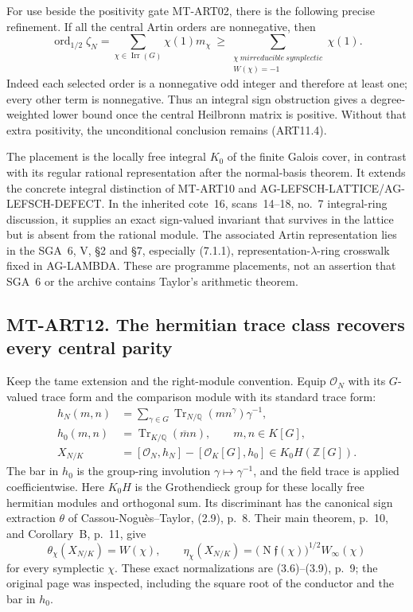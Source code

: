 For use beside the positivity gate MT-ART02, there is the
following precise refinement. If all the central Artin
orders are nonnegative, then
\[
 \operatorname{ord}_{1/2}\zeta_N
   =\sum_{\chi\in\operatorname{Irr}(G)}\chi(1)m_\chi
   \ \ge\!
   \sum_{\substack{\chi\ {
m irreducible\ symplectic}\\W(\chi)=-1}}
                         \chi(1).                       \tag{ART11.5}
\]
Indeed each selected order is a nonnegative odd integer
and therefore at least one; every other term is
nonnegative. Thus an integral sign obstruction gives a
degree-weighted lower bound once the central Heilbronn
matrix is positive. Without that extra positivity, the
unconditional conclusion remains (ART11.4).

The placement is the locally free integral $K_0$ of the
finite Galois cover, in contrast with its regular rational
representation after the normal-basis theorem. It extends
the concrete integral distinction of MT-ART10 and
AG-LEFSCH-LATTICE/AG-LEFSCH-DEFECT. In the inherited
cote~16, scans~14--18, no.~7 integral-ring discussion,
it supplies an exact sign-valued invariant that survives
in the lattice but is absent from the rational module.
The associated Artin representation lies in the
SGA~6, V, \S2 and \S7, especially (7.1.1),
representation-$\lambda$-ring crosswalk fixed in AG-LAMBDA.
These are programme placements, not an assertion that
SGA~6 or the archive contains Taylor's arithmetic theorem.

\subsection*{MT-ART12. The hermitian trace class recovers every central parity}
Keep the tame extension and the right-module convention.
Equip $\mathcal O_N$ with its $G$-valued trace form
and the comparison module with its standard trace form:
\[
 \begin{split}
 h_N(m,n)&=\sum_{\gamma\in G}
                \operatorname{Tr}_{N/\mathbb Q}(m n^\gamma)
                                \gamma^{-1},\\
 h_0(m,n)&=\operatorname{Tr}_{K/\mathbb Q}(\overline m n),
       \qquad m,n\in K[G],\\
 X_{N/K}&=[\mathcal O_N,h_N]-[\mathcal O_K[G],h_0]
                   \in K_0H(\mathbb Z[G]).
 \end{split}                                             \tag{ART12.1}
\]
The bar in $h_0$ is the group-ring involution
$\gamma\mapsto\gamma^{-1}$, and the field trace is
applied coefficientwise. Here $K_0H$ is the Grothendieck
group for these locally free hermitian modules and
orthogonal sum. Its discriminant has the canonical
sign extraction $\theta$ of Cassou-Nogu\`es--Taylor,
(2.9), p.~8. Their main theorem, p.~10, and
Corollary~B, p.~11, give
\[
 \theta_\chi(X_{N/K})=W(\chi),\qquad
 \eta_\chi(X_{N/K})=
       \bigl(\operatorname{N}\mathfrak f(\chi)\bigr)^{1/2}
                                      W_\infty(\chi)
                                                        \tag{ART12.2}
\]
for every symplectic $\chi$. These exact normalizations
are (3.6)--(3.9), p.~9; the original page was inspected,
including the square root of the conductor and the bar
in $h_0$.

